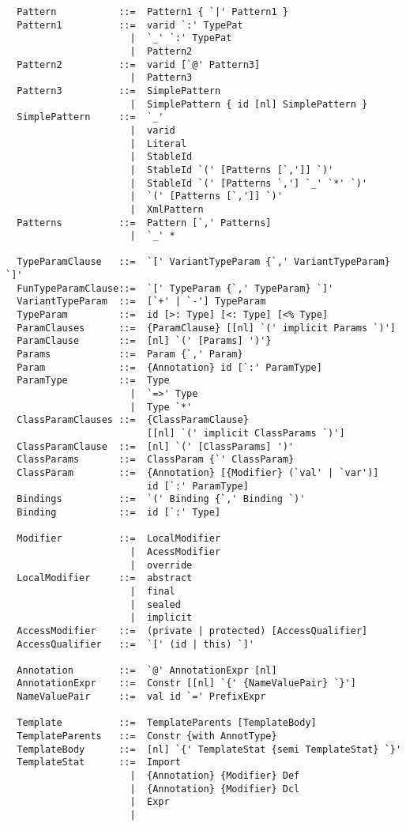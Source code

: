 {\begin{lstlisting}
  Pattern           ::=  Pattern1 { `|' Pattern1 }
  Pattern1          ::=  varid `:' TypePat
                      |  `_' `:' TypePat
                      |  Pattern2
  Pattern2          ::=  varid [`@' Pattern3]
                      |  Pattern3
  Pattern3          ::=  SimplePattern
                      |  SimplePattern { id [nl] SimplePattern }
  SimplePattern     ::=  `_'
                      |  varid
                      |  Literal
                      |  StableId
                      |  StableId `(' [Patterns [`,']] `)'
                      |  StableId `(' [Patterns `,'] `_' `*' `)'
                      |  `(' [Patterns [`,']] `)'
                      |  XmlPattern
  Patterns          ::=  Pattern [`,' Patterns]
                      |  `_' *

  TypeParamClause   ::=  `[' VariantTypeParam {`,' VariantTypeParam} `]'
  FunTypeParamClause::=  `[' TypeParam {`,' TypeParam} `]'
  VariantTypeParam  ::=  [`+' | `-'] TypeParam
  TypeParam         ::=  id [>: Type] [<: Type] [<% Type]
  ParamClauses      ::=  {ParamClause} [[nl] `(' implicit Params `)']
  ParamClause       ::=  [nl] `(' [Params] ')'} 
  Params            ::=  Param {`,' Param}
  Param             ::=  {Annotation} id [`:' ParamType]
  ParamType         ::=  Type 
                      |  `=>' Type 
                      |  Type `*'
  ClassParamClauses ::=  {ClassParamClause} 
                         [[nl] `(' implicit ClassParams `)']
  ClassParamClause  ::=  [nl] `(' [ClassParams] ')'
  ClassParams       ::=  ClassParam {`' ClassParam}
  ClassParam        ::=  {Annotation} [{Modifier} (`val' | `var')] 
                         id [`:' ParamType]
  Bindings          ::=  `(' Binding {`,' Binding `)'
  Binding           ::=  id [`:' Type]

  Modifier          ::=  LocalModifier 
                      |  AcessModifier
                      |  override
  LocalModifier     ::=  abstract
                      |  final
                      |  sealed
                      |  implicit
  AccessModifier    ::=  (private | protected) [AccessQualifier]
  AccessQualifier   ::=  `[' (id | this) `]'

  Annotation        ::=  `@' AnnotationExpr [nl]
  AnnotationExpr    ::=  Constr [[nl] `{' {NameValuePair} `}']
  NameValuePair     ::=  val id `=' PrefixExpr

  Template          ::=  TemplateParents [TemplateBody]
  TemplateParents   ::=  Constr {with AnnotType}
  TemplateBody      ::=  [nl] `{' TemplateStat {semi TemplateStat} `}'
  TemplateStat      ::=  Import
                      |  {Annotation} {Modifier} Def
                      |  {Annotation} {Modifier} Dcl
                      |  Expr
                      |


\end{lstlisting}}
